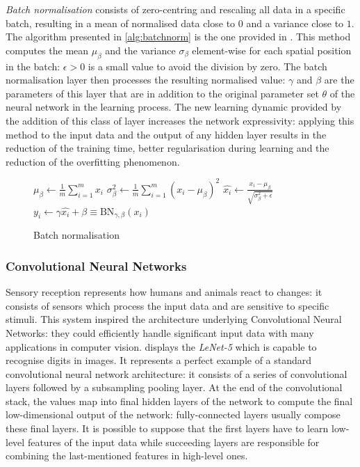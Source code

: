 \textit{Batch normalisation} consists of zero-centring and rescaling all data in a specific batch, resulting in a  mean of normalised data close to $0$ and a variance close to $1$.
The algorithm presented in \vref{alg:batchnorm} is the one provided in \cite{ioffe2015batch}.
This method computes the mean $\mu_\beta$ and the variance $\sigma_\beta$  element-wise for each spatial position in the batch: $\epsilon > 0$ is a small value to avoid the division by zero.
The batch normalisation layer then processes the resulting normalised value: $\gamma$ and $\beta$ are the parameters of this layer that are in addition to the original parameter set $\theta$ of the neural network in the learning process.
The new learning dynamic provided by the addition of this class of layer increases the network expressivity: applying this method to the input data and the output of any hidden layer results in the reduction of the training time, better regularisation during learning and the reduction of the overfitting phenomenon.
\begin{figure}
	\begin{algorithm}[H]
		\SetAlgoLined
		\DontPrintSemicolon
		\LinesNumbered
		$\mu_\beta \leftarrow \frac{1}{m} \sum_{i=1}^{m} x_i $ 
		$\sigma_\beta^2 \leftarrow \frac{1}{m} \sum_{i=1}^{m} (x_i-\mu_\beta)^2 $ 
		$\hat{x_i} \leftarrow \frac{x_i - \mu_\beta}{\sqrt{\sigma^2_\beta + \epsilon}} $
		$y_i \leftarrow \gamma \hat{x_i} + \beta \equiv \text{BN}_{\gamma, \beta}(x_i)$
		\caption{Batch normalisation}
		\label{alg:batchnorm}
	\end{algorithm}
\end{figure}

\subsubsection{Convolutional Neural Networks}

Sensory reception represents how humans and animals react to changes: it consists of sensors which process the input data and are sensitive to specific stimuli.
This system inspired the architecture underlying Convolutional Neural Networks: they could efficiently handle significant input data with many applications in computer vision.
 displays the \textit{LeNet-5} \cite{lecun1998gradient} which is capable to recognise digits in images.
It represents a perfect example of a standard convolutional neural network architecture: it consists of a series of convolutional layers followed by a subsampling pooling layer.
At the end of the convolutional stack, the values map into final hidden layers of the network to compute the final low-dimensional output of the network: fully-connected layers usually compose these final layers.
It is possible to suppose that the first layers have to learn low-level features of the input data while succeeding layers are responsible for combining the last-mentioned features in high-level ones.

